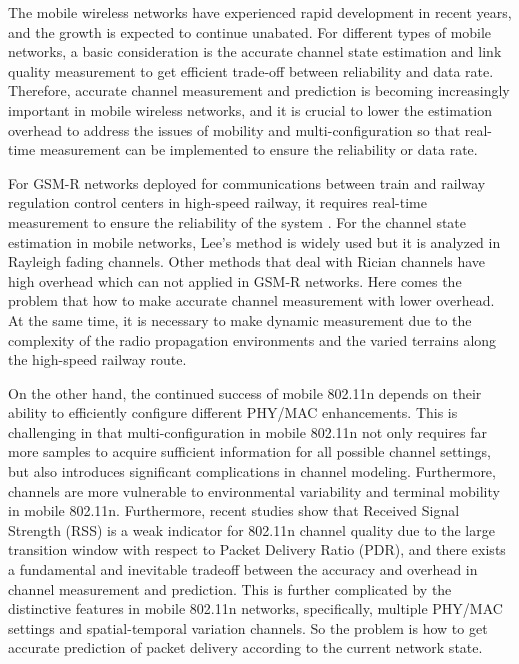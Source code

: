 \begin{englishabstract}

The mobile wireless networks have experienced rapid development in recent years, and the growth is expected to continue unabated. For different types of mobile networks, a basic consideration is the accurate channel state estimation and link quality measurement to get efficient trade-off between reliability and data rate. Therefore, accurate channel measurement and prediction is becoming increasingly important in mobile wireless networks, and it is crucial to lower the estimation overhead to address the issues of mobility and multi-configuration so that real-time measurement can be implemented to ensure the reliability or data rate.
 
For GSM-R networks deployed for communications between train and railway regulation control centers in high-speed railway, it requires real-time measurement to ensure the reliability of the system \cite{baldini2010early}. For the channel state estimation in mobile networks, Lee's method \cite{lee1985estimate} is widely used but it is analyzed in Rayleigh fading channels. Other methods that deal with Rician channels have high overhead which can not applied in GSM-R networks. Here comes the problem that how to make accurate channel measurement with lower overhead. At the same time, it is necessary to make dynamic measurement due to the complexity of the radio propagation environments and the varied terrains along the high-speed railway route.
 
On the other hand, the continued success of mobile 802.11n depends on their ability to efficiently configure different PHY/MAC enhancements. This is challenging in that multi-configuration in mobile 802.11n not only requires far more samples to acquire sufficient information for all possible channel settings, but also introduces significant complications in channel modeling. Furthermore, channels are more vulnerable to environmental variability and terminal mobility in mobile 802.11n. Furthermore, recent studies show that Received Signal Strength (RSS) is a weak indicator for 802.11n channel quality due to the large transition window with respect to Packet Delivery Ratio (PDR), and there exists a fundamental and inevitable tradeoff between the accuracy and overhead in channel measurement and prediction. This is further complicated by the distinctive features in mobile 802.11n networks, specifically, multiple PHY/MAC settings and spatial-temporal variation channels. So the problem is how to get accurate prediction of packet delivery according to the current network state.


\end{englishabstract}
